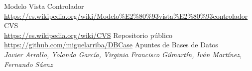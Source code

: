 \begin{thebibliography}{9}
Modelo Vista Controlador
\\\url{https://es.wikipedia.org/wiki/Modelo\%E2\%80\%93vista\%E2\%80\%93controlador}
CVS
\\\url{https://es.wikipedia.org/wiki/CVS}
Repositorio público
\\\url{https://github.com/miguelarriba/DBCase}
\bibitem{} 
Apuntes de Bases de Datos\\
\textit{Javier Arrollo, Yolanda García, Virginia Francisco Gilmartín, Iván Martínez, Fernando Sáenz}
\end{thebibliography}